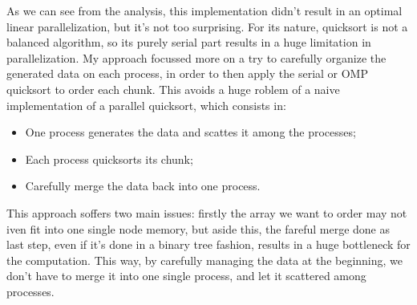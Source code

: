 \documentclass{article}
\begin{document}
	As we can see from the analysis, this implementation didn't result in an optimal linear parallelization, but it's not too surprising.
	For its nature, quicksort is not a balanced algorithm, so its purely serial part results in a huge limitation in parallelization.
	My approach focussed more on a try to carefully organize the generated data on each process, in order to then apply the serial or OMP quicksort to order each chunk. This avoids a huge roblem of a naive implementation of a parallel quicksort, which consists in:
	\begin{itemize}
		\item One process generates the data and scattes it among the processes;
		\item Each process quicksorts its chunk;
		\item Carefully merge the data back into one process.
	\end{itemize}
	This approach soffers two main issues: firstly the array we want to order may not iven fit into one single node memory, but aside this, the fareful merge done as last step, even if it's done in a binary tree fashion, results in a huge bottleneck for the computation. This way, by carefully managing the data at the beginning, we don't have to merge it into one single process, and let it scattered among processes.
	
\end{document}
